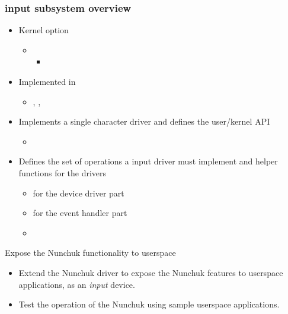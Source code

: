 \begin{frame}
  \frametitle{input subsystem overview}
  \begin{itemize}
  \item Kernel option 
    \begin{itemize}
    \item {}
      \begin{itemize}
      \item {}
      \end{itemize}
    \end{itemize}
  \item Implemented in 
    \begin{itemize}
    \item {}, , 
    \end{itemize}
  \item Implements a single character driver and defines the
    user/kernel API
    \begin{itemize}
    \item {}
    \end{itemize}
  \item Defines the set of operations a input driver must implement
    and helper functions for the drivers
    \begin{itemize}
    \item {} for the device driver part
    \item {} for the event handler part
    \item  {}
    \end{itemize}
  \end{itemize}
\end{frame}

\setuplabframe
{Expose the Nunchuk functionality to userspace}
{
  \begin{itemize}
  \item Extend the Nunchuk driver to expose the Nunchuk features to
    userspace applications, as an {\em input} device.
  \item Test the operation of the Nunchuk using sample userspace
    applications.
  \end{itemize}
}
